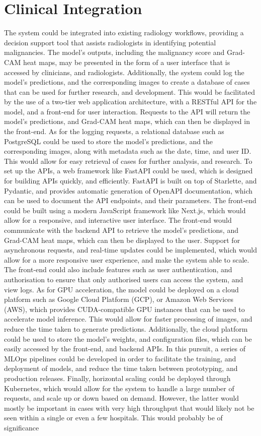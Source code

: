 \documentclass[../main]{subfiles}
\begin{document}
\section{Clinical Integration}
The system could be integrated into existing radiology workflows, providing a decision support tool that assists radiologists in identifying potential malignancies. The model's outputs, including the malignancy score and Grad-CAM heat maps, may be presented in the form of a user interface that is accessed by clinicians, and radiologists. Additionally, the system could log the model's predictions, and the corresponding images to create a database of cases that can be used for further research, and development. This would be facilitated by the use of a two-tier web application architecture, with a RESTful API for the model, and a front-end for user interaction. Requests to the API will return the model's predictions, and Grad-CAM heat maps, which can then be displayed in the front-end. As for the logging requests, a relational database such as PostgreSQL could be used to store the model's predictions, and the corresponding images, along with metadata such as the date, time, and user ID. This would allow for easy retrieval of cases for further analysis, and research. To set up the APIs, a web framework like FastAPI could be used, which is designed for building APIs quickly, and efficiently. FastAPI is built on top of Starlette, and Pydantic, and provides automatic generation of OpenAPI documentation, which can be used to document the API endpoints, and their parameters. The front-end could be built using a modern JavaScript framework like Next.js, which would allow for a responsive, and interactive user interface. The front-end would communicate with the backend API to retrieve the model's predictions, and Grad-CAM heat maps, which can then be displayed to the user. Support for asynchronous requests, and real-time updates could be implemented, which would allow for a more responsive user experience, and make the system able to scale. The front-end could also include features such as user authentication, and authorisation to ensure that only authorised users can access the system, and view logs. As for GPU acceleration, the model could be deployed on a cloud platform such as Google Cloud Platform (GCP), or Amazon Web Services (AWS), which provides CUDA-compatible GPU instances that can be used to accelerate model inference. This would allow for faster processing of images, and reduce the time taken to generate predictions. Additionally, the cloud platform could be used to store the model's weights, and configuration files, which can be easily accessed by the front-end, and backend APIs. In this pursuit, a series of MLOps pipelines could be developed in order to facilitate the training, and deployment of models, and reduce the time taken between prototyping, and production releases. Finally, horizontal scaling could be deployed through Kubernetes, which would allow for the system to handle a large number of requests, and scale up or down based on demand. However, the latter would mostly be important in cases with very high throughput that would likely not be seen within a single or even a few hospitals. This would probably be of significance 
\end{document}
